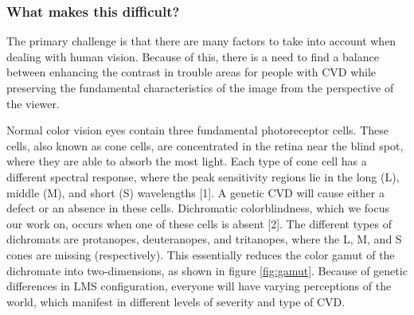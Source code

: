 \documentclass[10pt,twocolumn,letterpaper]{article}
\begin{document}
\subsubsection{What makes this difficult?}
The primary challenge is that there are many factors to take into account when dealing with human vision. Because of this, there is a need to find a balance between enhancing the contrast in trouble areas for people with CVD while preserving the fundamental characteristics of the image from the perspective of the viewer. 

Normal color vision eyes contain three fundamental photoreceptor cells. These cells, also known as cone cells, are concentrated in the retina near the blind spot, where they are able to absorb the most light. Each type of cone cell has a different spectral response, where the peak sensitivity regions lie in the long (L), middle (M), and short (S) wavelengths [1]. A genetic CVD will cause either a defect or an absence in these cells. Dichromatic colorblindness, which we focus our work on, occurs when one of these cells is absent [2]. The different types of dichromats are protanopes, deuteranopes, and tritanopes, where the L, M, and S cones are missing (respectively). This essentially reduces the color gamut of the dichromate into two-dimensions, as shown in figure \ref{fig:gamut}. Because of genetic differences in LMS configuration, everyone will have varying perceptions of the world, which manifest in different levels of severity and type of CVD. 
\end{document}
